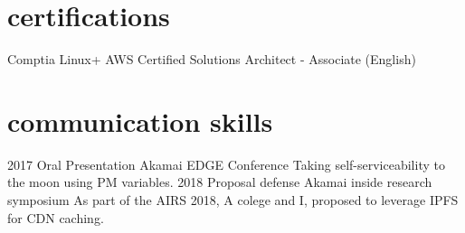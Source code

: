 \documentclass[]{friggeri-cv}
\begin{document}

 \section{certifications}
 \begin{entrylist}
 	\entry Comptia Linux+
 	\entry AWS Certified Solutions Architect - Associate (English)
 \end{entrylist}


\section{communication skills}

\begin{entrylist}
\entry
{2017}
{Oral Presentation}
{Akamai EDGE Conference}
{Taking self-serviceability to the moon using PM variables.}
\entry
{2018}
{Proposal defense}
{Akamai inside research symposium}
{As part of the AIRS 2018, A colege and I, proposed to leverage IPFS for CDN caching.}
\end{entrylist}

% 
\end{document}
